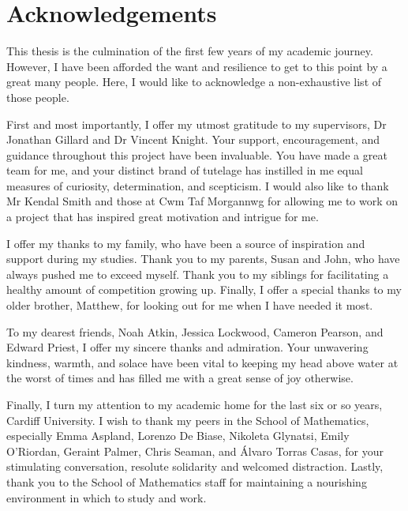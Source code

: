 \chapter*{Acknowledgements}

This thesis is the culmination of the first few years of my academic journey.
However, I have been afforded the want and resilience to get to this point by a
great many people. Here, I would like to acknowledge a non-exhaustive list of
those people.

First and most importantly, I offer my utmost gratitude to my supervisors, Dr
Jonathan Gillard and Dr Vincent Knight. Your support, encouragement, and
guidance throughout this project have been invaluable. You have made a great
team for me, and your distinct brand of tutelage has instilled in me equal
measures of curiosity, determination, and scepticism. I would also like to thank
Mr Kendal Smith and those at Cwm Taf Morgannwg for allowing me to work on a
project that has inspired great motivation and intrigue for me.

I offer my thanks to my family, who have been a source of inspiration and
support during my studies. Thank you to my parents, Susan and John, who have
always pushed me to exceed myself. Thank you to my siblings for facilitating a
healthy amount of competition growing up. Finally, I offer a special thanks to
my older brother, Matthew, for looking out for me when I have needed it most.

To my dearest friends, Noah Atkin, Jessica Lockwood, Cameron Pearson, and Edward
Priest, I offer my sincere thanks and admiration. Your unwavering kindness,
warmth, and solace have been vital to keeping my head above water at the worst
of times and has filled me with a great sense of joy otherwise.

Finally, I turn my attention to my academic home for the last six or so years,
Cardiff University. I wish to thank my peers in the School of Mathematics,
especially Emma Aspland, Lorenzo De Biase, Nikoleta Glynatsi, Emily O'Riordan,
Geraint Palmer, Chris Seaman, and \'{A}lvaro Torras Casas, for your stimulating
conversation, resolute solidarity and welcomed distraction. Lastly, thank you to
the School of Mathematics staff for maintaining a nourishing environment in
which to study and work. 
